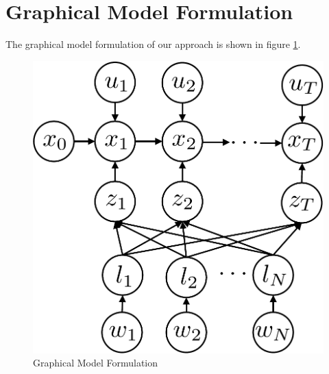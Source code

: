 \section{Graphical Model Formulation}
The graphical model formulation of our approach is shown in figure \ref{fig:model}. 
\begin{figure}[h]
\begin{center}
 \includegraphics[width=0.5\linewidth]{fig/model} 
\end{center}
\caption{Graphical Model Formulation}
\label{fig:model}
\end{figure}
